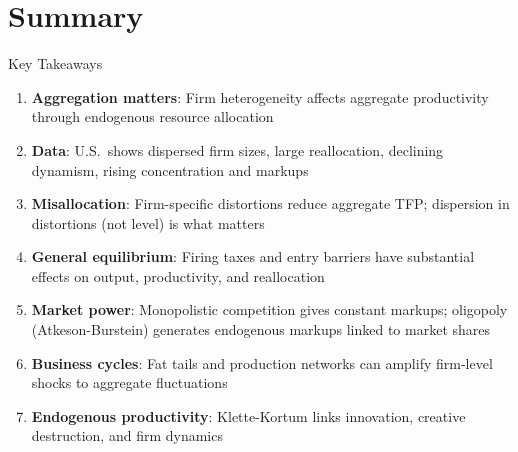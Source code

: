 \documentclass[blue]{beamer}
\begin{document}
\section{Summary}

\begin{frame}{Key Takeaways}
	\begin{enumerate}
		\item \textbf{Aggregation matters}: Firm heterogeneity affects aggregate productivity through endogenous resource allocation
		
		\item \textbf{Data}: U.S.\ shows dispersed firm sizes, large reallocation, declining dynamism, rising concentration and markups
		
		\item \textbf{Misallocation}: Firm-specific distortions reduce aggregate TFP; dispersion in distortions (not level) is what matters
		
		\item \textbf{General equilibrium}: Firing taxes and entry barriers have substantial effects on output, productivity, and reallocation
		
		\item \textbf{Market power}: Monopolistic competition gives constant markups; oligopoly (Atkeson-Burstein) generates endogenous markups linked to market shares
		
		\item \textbf{Business cycles}: Fat tails and production networks can amplify firm-level shocks to aggregate fluctuations
		
		\item \textbf{Endogenous productivity}: Klette-Kortum links innovation, creative destruction, and firm dynamics
	\end{enumerate}
\end{frame}
\end{document}
